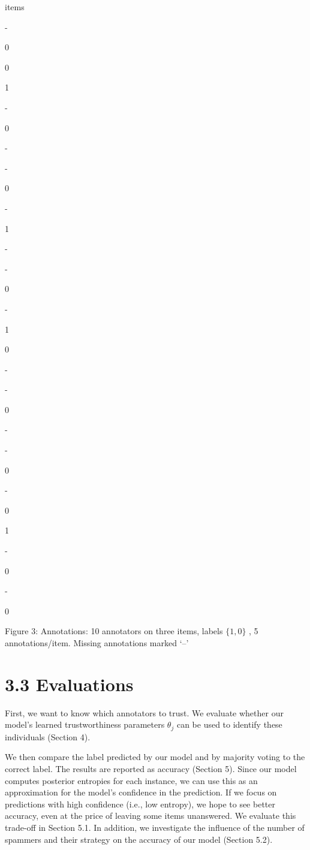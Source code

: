 \documentclass[
]{article}
\begin{document}
items

-

0

0

1

-

0

-

-

0

-

1

-

-

0

-

1

0

-

-

0

-

-

0

-

0

1

-

0

-

0

Figure 3: Annotations: 10 annotators on three items, labels \(\{1, 0\}\)
, 5 annotations/item. Missing annotations marked `--'

\section{3.3 Evaluations}\label{evaluations}

First, we want to know which annotators to trust. We evaluate whether
our model's learned trustworthiness parameters \(\theta_{j}\) can be
used to identify these individuals (Section 4).

We then compare the label predicted by our model and by majority voting
to the correct label. The results are reported as accuracy (Section 5).
Since our model computes posterior entropies for each instance, we can
use this as an approximation for the model's confidence in the
prediction. If we focus on predictions with high confidence (i.e., low
entropy), we hope to see better accuracy, even at the price of leaving
some items unanswered. We evaluate this trade-off in Section 5.1. In
addition, we investigate the influence of the number of spammers and
their strategy on the accuracy of our model (Section 5.2).
\end{document}
